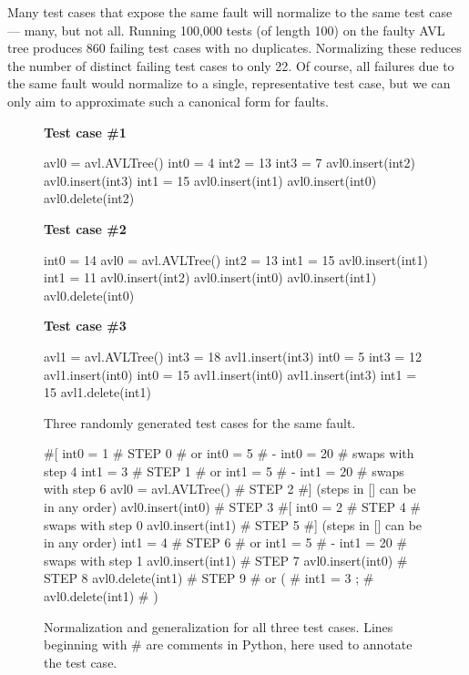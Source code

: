 Many test cases that expose the same fault will normalize to the same
test case --- many, but not all.  Running 100,000 tests (of length
100) on the faulty AVL tree produces 860 failing test cases with no
duplicates.  Normalizing these reduces the number of distinct failing
test cases to only 22.  Of course, all failures due to the same fault
would normalize to a single, representative test case, but we can only
aim to approximate such a canonical form for faults.

\begin{figure}
{\scriptsize
{\bf Test case \#1}
\begin{code}
avl0 = avl.AVLTree() 
int0 = 4 
int2 = 13 
int3 = 7 
avl0.insert(int2) 
avl0.insert(int3) 
int1 = 15 
avl0.insert(int1) 
avl0.insert(int0) 
avl0.delete(int2)
\end{code}
{\bf Test case \#2}
\begin{code}
int0 = 14 
avl0 = avl.AVLTree() 
int2 = 13 
int1 = 15 
avl0.insert(int1) 
int1 = 11 
avl0.insert(int2) 
avl0.insert(int0) 
avl0.insert(int1) 
avl0.delete(int0) 
\end{code}
{\bf Test case \#3}
\begin{code}
avl1 = avl.AVLTree() 
int3 = 18 
avl1.insert(int3) 
int0 = 5 
int3 = 12 
avl1.insert(int0) 
int0 = 15 
avl1.insert(int0) 
avl1.insert(int3) 
int1 = 15 
avl1.delete(int1) 
\end{code}
}
\caption {Three randomly generated test cases for the same fault.}
\label{threetests}
\end{figure}

\begin{figure}
{\scriptsize
\begin{code}
\#[
int0 = 1                       \# STEP 0
\#  or int0 = 5 
\#   - int0 = 20 
\#  swaps with step 4
int1 = 3                       \# STEP 1
\#  or int1 = 5 
\#   - int1 = 20 
\#  swaps with step 6
avl0 = avl.AVLTree()           \# STEP 2
\#] (steps in [] can be in any order)
avl0.insert(int0)              \# STEP 3
\#[
int0 = 2                       \# STEP 4
\#  swaps with step 0
avl0.insert(int1)              \# STEP 5
\#] (steps in [] can be in any order)
int1 = 4                       \# STEP 6
\#  or int1 = 5 
\#   - int1 = 20 
\#  swaps with step 1
avl0.insert(int1)              \# STEP 7
avl0.insert(int0)              \# STEP 8
avl0.delete(int1)              \# STEP 9
\#  or (
\#      int1 = 3  ;
\#      avl0.delete(int1) 
\#     )
\end{code}
}
\caption{Normalization and generalization for all three test cases.
  Lines beginning with \# are comments in Python, here used to
annotate the test case.}
\label{normalgen}
\end{figure}